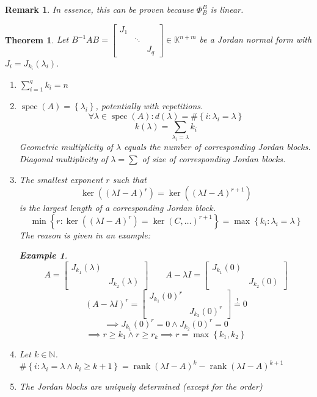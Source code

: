 \documentclass{article}
\newcounter{lecref}[section]
\numberwithin{lecref}{section}
\newtheorem{theorem}[lecref]{Theorem}
\newtheorem{example}[lecref]{Example}
\newtheorem{remark}[lecref]{Remark}
\newcommand{\set}[1]{\left\{#1\right\}}
\DeclareMathOperator{\rank}{rank}
\begin{document}
\begin{remark}
  In essence, this can be proven because $\Phi_B^B$ is linear.
\end{remark}

\begin{theorem} %
  Let $B^{-1} AB = \begin{bmatrix} J_1 & & \\ & \ddots & \\ & & J_q \end{bmatrix} \in \mathbb K^{n + m}$ be a Jordan normal form with $J_i = J_{k_i}(\lambda_i)$.
  \begin{enumerate}
    \item $\sum_{i=1}^q k_i = n$
    \item $\operatorname{spec}(A) = \set{\lambda_i}$, potentially with repetitions.
      \[ \forall \lambda \in \operatorname{spec}(A): d(\lambda) = \#\set{i: \lambda_i = \lambda} \]
      \[ k(\lambda) = \sum_{\lambda_i = \lambda} k_i \]
      Geometric multiplicity of $\lambda$ equals the number of corresponding Jordan blocks.
      Diagonal multiplicity of $\lambda = \sum$ of size of corresponding Jordan blocks. %
    \item The smallest exponent $r$ such that
      \[ \ker((\lambda I - A)^r) = \ker((\lambda I - A)^{r+1}) \]
      is the largest length of a corresponding Jordan block.
      \[ \min\set{r: \ker((\lambda I - A)^r) = \ker(C, \dots)^{r+1}} = \max\set{k_i: \lambda_i = \lambda} \]
      The reason is given in an example:
      \begin{example}
        \[
          A = \begin{bmatrix}
            J_{k_1}(\lambda) & \\
            & J_{k_2}(\lambda)
          \end{bmatrix}
          \qquad
          A - \lambda I = \begin{bmatrix}
            J_{k_1}(0) & \\
            & J_{k_2}(0)
          \end{bmatrix}
        \] \[
          (A - \lambda I)^r = \begin{bmatrix}
            J_{k_1}(0)^r & \\
            & J_{k_2}(0)^r
          \end{bmatrix}
          \overset!= 0
        \] \[
          \implies J_{k_1}(0)^r = 0 \land J_{k_2}(0)^r = 0
        \] \[
          \implies r \geq k_1 \land r \geq r_k \implies r = \max\set{k_1, k_2}
        \]
      \end{example}
    \item Let $k \in \mathbb N$. $\#\set{i: \lambda_i = \lambda \land k_i \geq k + 1} = \rank(\lambda I - A)^k - \rank(\lambda I - A)^{k+1}$
    \item The Jordan blocks are uniquely determined (except for the order)
  \end{enumerate}
\end{theorem}
\end{document}
